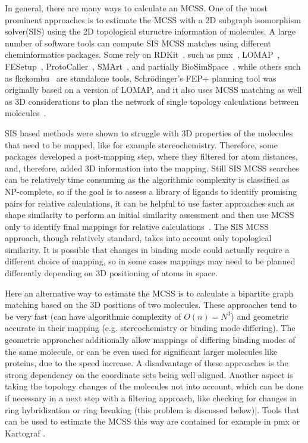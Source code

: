 \documentclass[9pt,bestpractices]{livecoms}
\begin{document}
In general, there are many ways to calculate an MCSS. One of the most prominent approaches is to estimate the MCSS with a 2D subgraph isomorphism solver(SIS) using the 2D topological stuructre information of molecules\cite{raymond2002maximum}.
A large number of software tools can compute SIS MCSS matches using different cheminformatics packages. Some rely on RDKit~\cite{rdkit2019Dec}, such as pmx~\cite{gapsys2015pmx}, LOMAP~\cite{liu2013lead}, FESetup~\cite{loeffler2015fesetup}, ProtoCaller~\cite{suruzhon2020protocaller}, SMArt~\cite{petrov2021perturbation}, and partially BioSimSpace~\cite{hedges2019biosimspace}, while others such as fkckombu~\cite{kawabata20143d} are standalone tools. Schr\"{o}dinger's FEP+ planning tool was originally based on a version of LOMAP, and it also uses MCSS matching as well as 3D considerations to plan the network of single topology calculations between molecules~\cite{wang2015accurate}. 

SIS based methods were shown to struggle with 3D properties of the molecules that need to be mapped, like for example stereochemistry. Therefore, some packages developed a post-mapping step, where they filtered for atom distances, and, therefore, added 3D information into the mapping.
Still SIS MCSS searches can be relatively time consuming as the algorithmic complexity is classified as NP-complete, so if the goal is to assess a library of ligands to identify promising pairs for relative calculations, it can be helpful to use faster approaches such as shape similarity to perform an initial similarity assessment and then use MCSS only to identify final mappings for relative calculations~\cite{raymond2002maximum,klabunde2012mars,jones2009elucidating, Duesbury2018Comparison}. The SIS MCSS approach, though relatively standard, takes into account only topological similarity. It is possible that changes in binding mode could actually require a different choice of mapping, so in some cases mappings may need to be planned differently depending on 3D positioning of atoms in space. 

Here an alternative way to estimate the MCSS is to calculate a bipartite graph matching based on the 3D positions of two molecules. These approaches tend to be very fast (can have algorithmic complexity of $O(n)=N^3$) and geometric accurate in their mapping (e.g. stereochemistry or binding mode differing).
The geometric approaches additionally allow mappings of differing binding modes of the same molecule, or can be even used for significant larger molecules like proteins, due to the speed increase.
A disadvantage of these approaches is the strong dependency on the coordinate sets being well aligned. Another aspect is taking the topology changes of the molecules not into account, which can be done if necessary in a next step with a filtering approach, like checking for changes in ring hybridization or ring breaking (this problem is discussed below)|.
Tools that can be used to estimate the MCSS this way are contained for example in pmx \cite{gapsys2015pmx} or Kartograf \cite{ries2024kartograf}.
\end{document}
